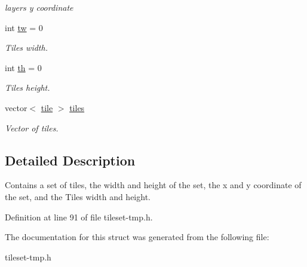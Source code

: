 \begin{DoxyCompactItemize}
\begin{DoxyCompactList}\small\item\em layers y coordinate \end{DoxyCompactList}\item 
int \hyperlink{structTileset_1_1layer_adcd99e50219d86c9d63bcc077c9d5874}{tw} = 0\hypertarget{structTileset_1_1layer_adcd99e50219d86c9d63bcc077c9d5874}{}\label{structTileset_1_1layer_adcd99e50219d86c9d63bcc077c9d5874}

\begin{DoxyCompactList}\small\item\em Tiles width. \end{DoxyCompactList}\item 
int \hyperlink{structTileset_1_1layer_a0be4ec31f6366ef7aaef324c7db104a7}{th} = 0\hypertarget{structTileset_1_1layer_a0be4ec31f6366ef7aaef324c7db104a7}{}\label{structTileset_1_1layer_a0be4ec31f6366ef7aaef324c7db104a7}

\begin{DoxyCompactList}\small\item\em Tiles height. \end{DoxyCompactList}\item 
vector$<$ \hyperlink{structTileset_1_1tile}{tile} $>$ \hyperlink{structTileset_1_1layer_a62507e6b900b36e83ac504aa92f44dc1}{tiles}\hypertarget{structTileset_1_1layer_a62507e6b900b36e83ac504aa92f44dc1}{}\label{structTileset_1_1layer_a62507e6b900b36e83ac504aa92f44dc1}

\begin{DoxyCompactList}\small\item\em Vector of tiles. \end{DoxyCompactList}\end{DoxyCompactItemize}


\subsection{Detailed Description}
Contains a set of tiles, the width and height of the set, the x and y coordinate of the set, and the Tiles width and height. 

Definition at line 91 of file tileset-\/tmp.\+h.



The documentation for this struct was generated from the following file\+:\begin{DoxyCompactItemize}
\item 
tileset-\/tmp.\+h\end{DoxyCompactItemize}
